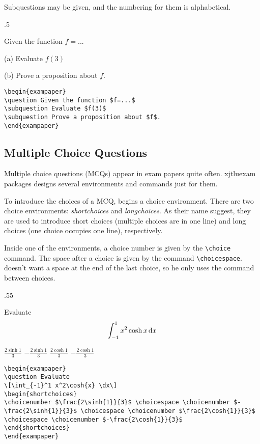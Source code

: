 Subquestions may be given, and the numbering for them is alphabetical.
\begin{miniexammar}{.5\textandmarginlen}{
\begin{exampaper}
\question Given the function $f=...$

\hspace{1.5em}(a) Evaluate $f(3)$

\hspace{1.5em}(b) Prove a proposition about $f$.
\end{exampaper}
}
\begin{lstlisting}
\begin{exampaper}
\question Given the function $f=...$
\subquestion Evaluate $f(3)$
\subquestion Prove a proposition about $f$.
\end{exampaper}
\end{lstlisting}
\end{miniexammar}

\subsection{Multiple Choice Questions}
Multiple choice questions (MCQs) appear in exam papers quite often. xjtluexam packages designs several environments and commands just for them.

To introduce the choices of a MCQ, \raul{} begins a choice environment. There are two choice environments: \emph{shortchoices} and \emph{longchoices}. As their name suggest, they are used to introduce short choices (multiple choices are in one line) and long choices (one choice occupies one line), respectively.

Inside one of the environments, a choice number is given by the \verb=\choice= command. The space after a choice is given by the command \verb=\choicespace=. \raul{} doesn't want a space at the end of the last choice, so he only uses the command between choices.
\begin{miniexammar}{.55\textandmarginlen}{
\begin{exampaper}
\question Evaluate
\[
\int_{-1}^1 x^2\cosh{x} \,\mathrm{d} x
\]
\begin{shortchoices}
\choicenumber $\frac{2\sinh{1}}{3}$ \choicespace
\choicenumber $-\frac{2\sinh{1}}{3}$ \choicespace
\choicenumber $\frac{2\cosh{1}}{3}$ \choicespace
\choicenumber $-\frac{2\cosh{1}}{3}$ 
\end{shortchoices}
\end{exampaper}
}
\begin{lstlisting}
\begin{exampaper}
\question Evaluate
\[\int_{-1}^1 x^2\cosh{x} \dx\]
\begin{shortchoices}
\choicenumber $\frac{2\sinh{1}}{3}$ \choicespace \choicenumber $-\frac{2\sinh{1}}{3}$ \choicespace \choicenumber $\frac{2\cosh{1}}{3}$ \choicespace \choicenumber $-\frac{2\cosh{1}}{3}$ 
\end{shortchoices}
\end{exampaper}
\end{lstlisting}
\end{miniexammar}

